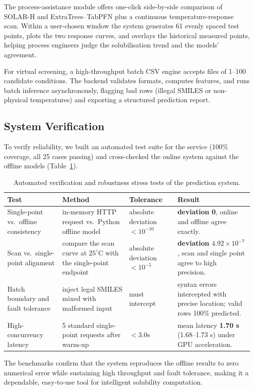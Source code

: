 The process-assistance module offers one-click side-by-side comparison of SOLAR-H and ExtraTrees--TabPFN plus a continuous temperature-response scan. Within a user-chosen window the system generates 61 evenly spaced test points, plots the two response curves, and overlays the historical measured points, helping process engineers judge the solubilisation trend and the models' agreement.

For virtual screening, a high-throughput batch CSV engine accepts files of 1--100 candidate conditions. The backend validates formats, computes features, and runs batch inference asynchronously, flagging bad rows (illegal SMILES or non-physical temperatures) and exporting a structured prediction report.

\subsection{System Verification}

To verify reliability, we built an automated test suite for the service (100\% coverage, all 25 cases passing) and cross-checked the online system against the offline models (Table~\ref{tab:v2-app-check}).

\begin{table}[htbp]
\centering\small
\caption{Automated verification and robustness stress tests of the prediction system.}
\label{tab:v2-app-check}
\begin{tabularx}{\linewidth}{@{}lllX@{}}
\toprule
Test & Method & Tolerance & Result \\
\midrule
Single-point vs.\ offline consistency & in-memory HTTP request vs.\ Python offline model & absolute deviation $< 10^{-10}$ & \textbf{deviation 0}, online and offline agree exactly. \\
Scan vs.\ single-point alignment & compare the scan curve at $25^\circ\text{C}$ with the single-point endpoint & absolute deviation $< 10^{-5}$ & \textbf{deviation $4.92\times10^{-7}$}, scan and single point agree to high precision. \\
Batch boundary and fault tolerance & inject legal SMILES mixed with malformed input & must intercept & syntax errors intercepted with precise location; valid rows 100\% predicted. \\
High-concurrency latency & 5 standard single-point requests after warm-up & $< 3.0\mathrm{s}$ & mean latency \textbf{1.70 s} (1.68--1.73 s) under GPU acceleration. \\
\bottomrule
\end{tabularx}
\end{table}

The benchmarks confirm that the system reproduces the offline results to zero numerical error while sustaining high throughput and fault tolerance, making it a dependable, easy-to-use tool for intelligent solubility computation.
